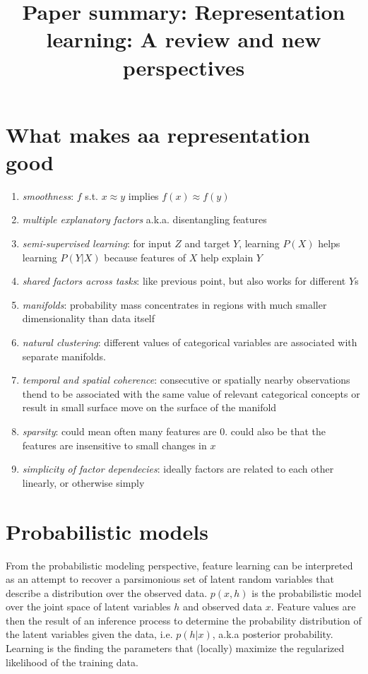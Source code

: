 \documentclass{article}
\title{Paper summary: Representation learning: A review and new perspectives}
\begin{document}
\maketitle

\section{What makes aa representation good}
\begin{enumerate}
		\item \textit{smoothness}: $ f  $ s.t. $ x \approx y  $ implies
				$ f(x) \approx f (y)  $
		\item \textit{multiple explanatory factors} a.k.a. disentangling 
				features
		\item \textit{semi-supervised learning}: for input $ Z  $ and target $ Y  $,
				learning $ P (X)  $ helps learning $ P (Y|X)  $ because
				features of $ X  $ help explain $ Y  $
		\item \textit{shared factors across tasks}: like previous point,
				but also works for different $ Y  $s
		\item \textit{manifolds}: probability mass concentrates
				in regions with much smaller dimensionality than data itself
		\item \textit{natural clustering}: different values of categorical variables
				are associated with separate manifolds.
		\item \textit{temporal and spatial coherence}:
				consecutive or spatially nearby observations
				thend to be associated with the same value of relevant categorical
				concepts or result in small surface move on the surface of the manifold
		\item \textit{sparsity}: could mean often many features are 0. could also be
				that the features are insensitive to small changes in $ x  $
		\item \textit{simplicity of factor dependecies}: ideally factors are related
				to each other linearly, or otherwise simply
\end{enumerate}

\section{Probabilistic models}
From the probabilistic modeling perspective, feature learning
can be interpreted as an attempt to recover a parsimonious set of latent random
variables that describe a distribution over the observed data.
$ p (x,h)  $ is the probabilistic model over the joint space
of latent variables $ h  $ and observed data $ x  $.
Feature values are then the result of an inference process to determine the probability
distribution of the latent variables given the data, i.e. $ p (h|x)  $,
a.k.a posterior probability.
Learning is the finding the parameters
that (locally) maximize the regularized likelihood of the training data.
\end{document}

